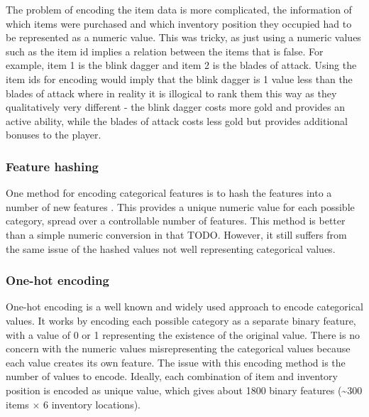 \documentclass[Report.tex]{subfiles}
\begin{document}
The problem of encoding the item data is more complicated, the information of which items were purchased and which inventory position they occupied had to be represented as a numeric value. This was tricky, as just using a numeric values such as the item id implies a relation between the items that is false. For example, item 1 is the blink dagger and item 2 is the blades of attack. Using the item ids for encoding would imply that the blink dagger is 1 value less than the blades of attack where in reality it is illogical to rank them this way as they qualitatively very different - the blink dagger costs more gold and provides an active ability, while the blades of attack costs less gold but provides additional bonuses to the player. 


\subsubsection{Feature hashing}
One method for encoding categorical features is to hash the features into a number of new features \cite{feature-hashing}. This provides a unique numeric value for each possible category, spread over a controllable number of features. This method is better than a simple numeric conversion in that TODO. However, it still suffers from the same issue of the hashed values not well representing categorical values. 

\subsubsection{One-hot encoding}
One-hot encoding is a well known and widely used approach to encode categorical values. It works by encoding each possible category as a separate binary feature, with a value of 0 or 1 representing the existence of the original value. There is no concern with the numeric values misrepresenting the categorical values because each value creates its own feature. The issue with this encoding method is the number of values to encode. Ideally, each combination of item and inventory position is encoded as unique value, which gives about 1800 binary features (\textasciitilde{}300 items $\times$ 6 inventory locations). 
\end{document}
